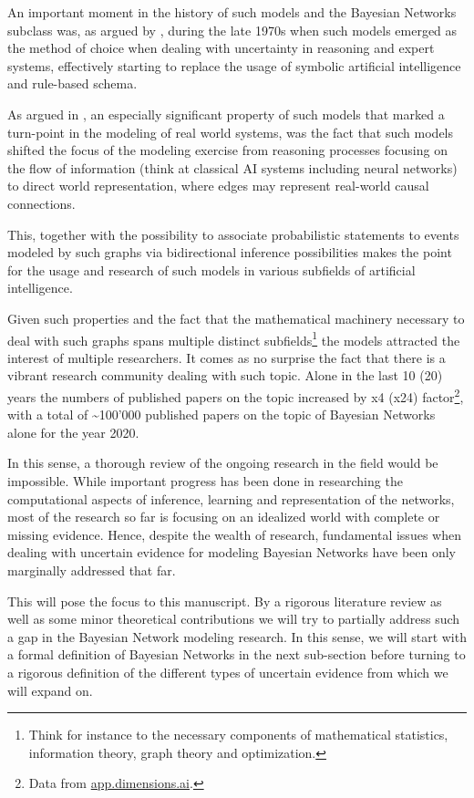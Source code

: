 \documentclass[11pt]{article}
\begin{document}
\begin{article}
An important moment in the history of such models and the Bayesian
Networks subclass was, as argued by \cite{pearl2011bayesian}, during
the late 1970s when such models emerged as the method of choice when
dealing with uncertainty in reasoning and expert systems,
effectively starting to replace the usage of symbolic artificial
intelligence and rule-based schema.

As argued in \cite{pearl2011bayesian}, an especially significant
property of such models that marked a turn-point in the modeling of
real world systems, was the fact that such models shifted the focus
of the modeling exercise from reasoning processes focusing on the
flow of information (think at classical AI systems including neural
networks) to direct world representation, where edges may represent
real-world causal connections.

This, together with the possibility to associate probabilistic
statements to events modeled by such graphs via bidirectional
inference possibilities makes the point for the usage and research
of such models in various subfields of artificial intelligence.

Given such properties and the fact that the mathematical machinery
necessary to deal with such graphs spans multiple distinct
subfields\footnote{Think for instance to the necessary components of mathematical
statistics, information theory, graph theory and optimization.} the models attracted the interest of multiple
researchers. It comes as no surprise the fact that there is a
vibrant research community dealing with such topic. Alone in the
last 10 (20) years the numbers of published papers on the topic
increased by x4 (x24) factor\footnote{Data from \href{https://app.dimensions.ai/discover/publication}{app.dimensions.ai}.}, with a total of \textasciitilde{}100'000
published papers on the topic of Bayesian Networks alone for the
year 2020.

In this sense, a thorough review of the ongoing research in the
field would be impossible. While important progress has been done
in researching the computational aspects of inference, learning and
representation of the networks, most of the research so far is
focusing on an idealized world with complete or missing
evidence. Hence, despite the wealth of research, fundamental issues
when dealing with uncertain evidence for modeling Bayesian Networks
have been only marginally addressed that far.

This will pose the focus to this manuscript. By a rigorous literature
review as well as some minor theoretical contributions we will try to
partially address such a gap in the Bayesian Network modeling
research. In this sense, we will start with a formal definition of
Bayesian Networks in the next sub-section before turning to a
rigorous definition of the different types of uncertain evidence
from which we will expand on.


\end{article}
\end{document}
